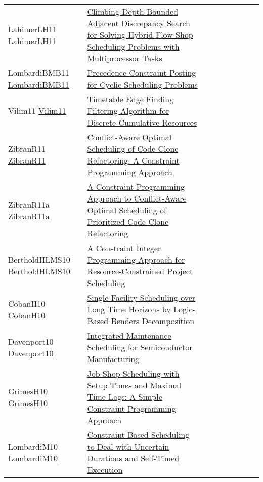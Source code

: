 {\begin{longtable}{p{3cm}p{7cm}lllllll}
LahimerLH11 \href{https://doi.org/10.1007/978-3-642-21311-3\_12}{LahimerLH11} &  \href{papers/LahimerLH11.pdf}{Climbing Depth-Bounded Adjacent Discrepancy Search for Solving Hybrid Flow Shop Scheduling Problems with Multiprocessor Tasks} &  &  &  &  &  &  & \\
LombardiBMB11 \href{https://doi.org/10.1007/978-3-642-21311-3\_14}{LombardiBMB11} &  \href{papers/LombardiBMB11.pdf}{Precedence Constraint Posting for Cyclic Scheduling Problems} &  &  &  &  &  &  & \\
Vilim11 \href{https://doi.org/10.1007/978-3-642-21311-3\_22}{Vilim11} &  \href{papers/Vilim11.pdf}{Timetable Edge Finding Filtering Algorithm for Discrete Cumulative Resources} &  &  &  &  &  &  & \\
ZibranR11 \href{https://doi.org/10.1109/ICPC.2011.45}{ZibranR11} &  \href{papers/ZibranR11.pdf}{Conflict-Aware Optimal Scheduling of Code Clone Refactoring: {A} Constraint Programming Approach} &  &  &  &  &  &  & \\
ZibranR11a \href{https://doi.org/10.1109/SCAM.2011.21}{ZibranR11a} &  \href{papers/ZibranR11a.pdf}{A Constraint Programming Approach to Conflict-Aware Optimal Scheduling of Prioritized Code Clone Refactoring} &  &  &  &  &  &  & \\
BertholdHLMS10 \href{https://doi.org/10.1007/978-3-642-13520-0\_34}{BertholdHLMS10} &  \href{papers/BertholdHLMS10.pdf}{A Constraint Integer Programming Approach for Resource-Constrained Project Scheduling} &  &  &  &  &  &  & \\
CobanH10 \href{https://doi.org/10.1007/978-3-642-13520-0\_11}{CobanH10} &  \href{papers/CobanH10.pdf}{Single-Facility Scheduling over Long Time Horizons by Logic-Based Benders Decomposition} &  &  &  &  &  &  & \\
Davenport10 \href{https://doi.org/10.1007/978-3-642-13520-0\_12}{Davenport10} &  \href{papers/Davenport10.pdf}{Integrated Maintenance Scheduling for Semiconductor Manufacturing} &  &  &  &  &  &  & \\
GrimesH10 \href{https://doi.org/10.1007/978-3-642-13520-0\_19}{GrimesH10} &  \href{papers/GrimesH10.pdf}{Job Shop Scheduling with Setup Times and Maximal Time-Lags: {A} Simple Constraint Programming Approach} &  &  &  &  &  &  & \\
LombardiM10 \href{https://doi.org/10.1007/978-3-642-15396-9\_32}{LombardiM10} &  \href{papers/LombardiM10.pdf}{Constraint Based Scheduling to Deal with Uncertain Durations and Self-Timed Execution} &  &  &  &  &  &  & \\

\end{longtable}}
